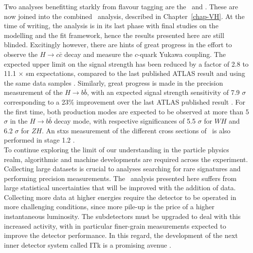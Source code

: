 Two analyses benefitting starkly from flavour tagging are the \vhb\ and \vhc. These are now joined into the combined \vhbc\ analysis, described in Chapter~\ref{chap-VH}. At the time of writing, the analysis is in its last phase with final studies on the modelling and the fit framework, hence the results presented here are still blinded. Excitingly however, there are hints of great progress in the effort to observe the $H \rightarrow c\bar{c}$ decay and measure the $c$-quark Yukawa coupling. The expected upper limit on the signal strength has been reduced by a factor of 2.8 to 11.1 $\times$ \gls{sm} expectations, compared to the last published ATLAS result and using the same data samples \cite{Collaboration:2721696}. Similarly, great progress is made in the precision measurement of the $H \rightarrow b\bar{b}$, with an expected signal strength sensitivity of 7.9 $\sigma$ corresponding to a 23\% improvement over the last ATLAS published result \cite{ATLAS:2021wqh}. For the first time, both production modes are expected to be observed at more than 5 $\sigma$ in the $H \rightarrow b\bar{b}$ decay mode, with respective significances of 5.5 $\sigma$ for $WH$ and 6.2 $\sigma$ for $ZH$. An \gls{stxs} measurement of the different cross sections of \vhb\ is also performed in stage 1.2 \cite{Butterworth:2015oua}. \\

To continue exploring the limit of our understanding in the particle physics realm, algorithmic and machine developments are required across the experiment. Collecting large datasets is crucial to analyses searching for rare signatures and performing precision measurements. The \vhbc\ analysis presented here suffers from large statistical uncertainties that will be improved with the addition of data. Collecting more data at higher energies require the detector to be operated in more challenging conditions, since more pile-up is the price of a higher instantaneous luminosity. The subdetectors must be upgraded to deal with this increased activity, with in particular finer-grain measurements expected to improve the detector performance. In this regard, the development of the next inner detector system called ITk is a promising avenue \cite{Bortoletto:2022wcx}. \\

